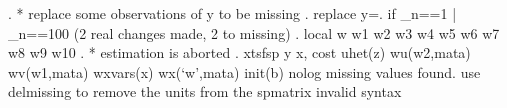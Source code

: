 . * replace some observations of y to be missing
. replace y=. if _n==1 | _n==100
(2 real changes made, 2 to missing)
{\smallskip}
. local w w1 w2 w3 w4 w5 w6 w7 w8 w9 w10
{\smallskip}
. * estimation is aborted
. xtsfsp y x, cost uhet(z) wu(w2,mata) wv(w1,mata) wxvars(x) wx(`w',mata) init(b) nolog
missing values found. use delmissing to remove the units from the spmatrix
invalid syntax
{\smallskip}
